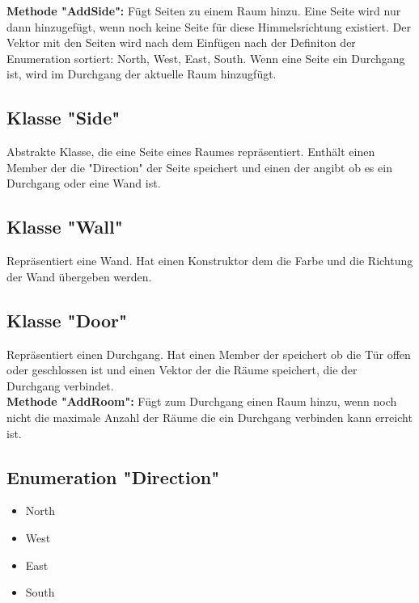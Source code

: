 \documentclass[12pt,a4paper]{article}
\begin{document}
\textbf {Methode "AddSide":}
Fügt Seiten zu einem Raum hinzu. Eine Seite wird nur dann hinzugefügt, wenn noch keine Seite für diese Himmelsrichtung existiert. Der Vektor mit den Seiten wird nach dem Einfügen nach der Definiton der Enumeration sortiert: North, West, East, South. Wenn eine Seite ein Durchgang ist, wird im Durchgang der aktuelle Raum hinzugfügt. \\

\subsection {Klasse "Side"} 
Abstrakte Klasse, die eine Seite eines Raumes repräsentiert. Enthält einen Member der die "Direction" der Seite speichert und einen der angibt ob es ein Durchgang oder eine Wand ist. \\

\subsection {Klasse "Wall"} 
Repräsentiert eine Wand. Hat einen Konstruktor dem die Farbe und die Richtung der Wand übergeben werden. \\

\subsection {Klasse "Door"} 
Repräsentiert einen Durchgang. Hat einen Member der speichert ob die Tür offen oder geschlossen ist und einen Vektor der die Räume speichert, die der Durchgang verbindet. \\

\textbf {Methode "AddRoom":}
Fügt zum Durchgang einen Raum hinzu, wenn noch nicht die maximale Anzahl der Räume die ein Durchgang verbinden kann erreicht ist.

\subsection {Enumeration "Direction"}
\begin {itemize}
	\item North
	\item West
	\item East
	\item South
\end {itemize}
\end{document}
